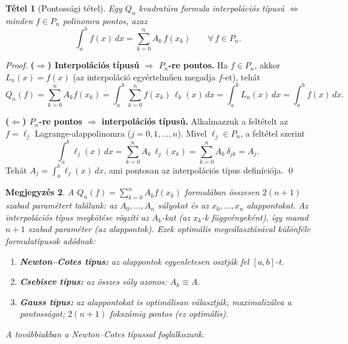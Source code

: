 \documentclass[a4paper,12pt]{article}
\theoremstyle{mydef}
\newtheorem{tetel}{Tétel}[section]
\newtheorem{megjegyzes}[tetel]{Megjegyzés}
\begin{document}
\begin{mdframed}[backgroundcolor=thmbg,linewidth=0pt,innertopmargin=8pt,innerbottommargin=8pt]
\begin{tetel}[Pontossági tétel]
\label{tetel:pontossagi}
Egy $Q_n$ kvadratúra formula interpolációs típusú $\Longleftrightarrow$ minden
$f \in P_n$ polinomra pontos, azaz
\[
  \int_a^b f(x)\,dx = \sum_{k=0}^n A_k\,f(x_k) \qquad \forall\,f \in P_n.
\]
\end{tetel}
\end{mdframed}

\begin{proof}
\textbf{($\Rightarrow$) Interpolációs típusú $\Rightarrow$ $P_n$-re pontos.}
Ha $f \in P_n$, akkor $L_n(x) = f(x)$ (az interpoláció egyértelműen megadja $f$-et), tehát
\[
  Q_n(f) = \sum_{k=0}^n A_k f(x_k) = \int_a^b \sum_{k=0}^n f(x_k)\,\ell_k(x)\,dx
  = \int_a^b L_n(x)\,dx = \int_a^b f(x)\,dx.
\]

\textbf{($\Leftarrow$) $P_n$-re pontos $\Rightarrow$ interpolációs típusú.}
Alkalmazzuk a feltételt az $f = \ell_j$ Lagrange-alappolinomra ($j = 0, 1, \ldots, n$).
Mivel $\ell_j \in P_n$, a feltétel szerint
\[
  \int_a^b \ell_j(x)\,dx = \sum_{k=0}^n A_k\,\ell_j(x_k) = \sum_{k=0}^n A_k\,\delta_{jk} = A_j.
\]
Tehát $A_j = \int_a^b \ell_j(x)\,dx$, ami pontosan az interpolációs típus definíciója. \qed
\end{proof}

\begin{megjegyzes}
A $Q_n(f) = \sum_{k=0}^n A_k f(x_k)$ formulában összesen $2(n+1)$ szabad paramétert
találunk: az $A_0, \ldots, A_n$ súlyokat és az $x_0, \ldots, x_n$ alappontokat.
Az interpolációs típus megkötése rögzíti az $A_k$-kat (az $x_k$-k függvényeként), így
marad $n+1$ szabad paraméter (az alappontok). Ezek optimális megválasztásával
különféle formulatípusok adódnak:

\begin{enumerate}[noitemsep,topsep=2pt]
  \item \textbf{Newton--Cotes típus:} az alappontok egyenletesen osztják fel $[a,b]$-t.
  \item \textbf{Csebisev típus:} az összes súly azonos: $A_k \equiv A$.
  \item \textbf{Gauss típus:} az alappontokat is optimálisan választják, maximalizálva a
        pontosságot; $2(n+1)$ fokszámig pontos (ez optimális).
\end{enumerate}
A továbbiakban a Newton--Cotes típussal foglalkozunk.
\end{megjegyzes}
\end{document}
